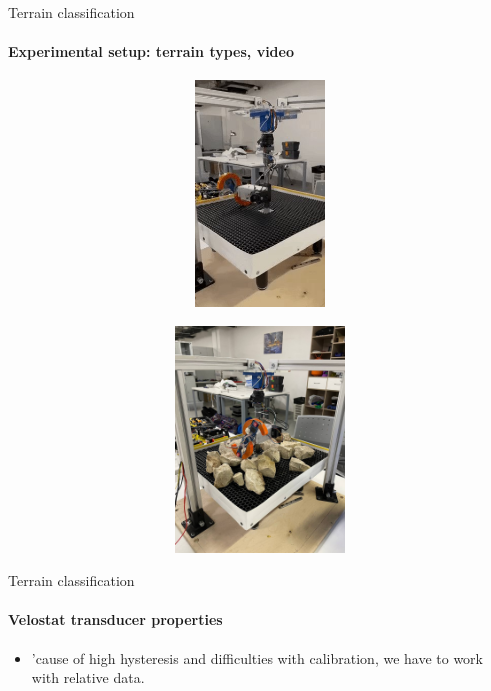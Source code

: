 \documentclass[aspectratio=169]{beamer}
\begin{document}
\begin{frame}[t]{Terrain classification}
    \framesubtitle{Experimental setup: terrain types, video}
    \vspace{-15pt}
    \begin{figure}[H]
        \begin{subfigure}{0.49\textwidth}
            \href{run:./videos/flat.gif}{\centering\includegraphics[height=6cm,width=1\textwidth,keepaspectratio]{s_shape_leg/flat.jpg}}
        \end{subfigure}
        \hfill
        \begin{subfigure}{0.49\textwidth}
            \href{run:./videos/rock.gif}{\centering\includegraphics[height=6cm,width=1\textwidth,keepaspectratio]{s_shape_leg/view.jpg}}
        \end{subfigure}
    \end{figure}
\end{frame}

\begin{frame}[t]{Terrain classification}
\framesubtitle{Velostat transducer properties}
\Large
\begin{itemize}
    \item 'cause of high hysteresis and difficulties with calibration, we have to work with relative data.
\end{itemize}
    
\end{frame}
\end{document}
